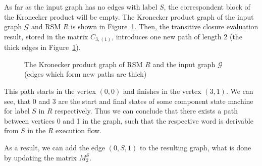 As far as the input graph has no edges with label $S$, the correspondent block of the Kronecker product will be empty. The Kronecker product graph of the input graph $\mathcal{G}$ and RSM $R$ is shown in Figure~\ref{fig:example_1_product}. Then, the transitive closure evaluation result, stored in the matrix $C_{3,(1)}$, introduces one new path of length 2 (the thick edges in Figure~\ref{fig:example_1_product}).

\begin{figure}[h]
    \centering
    \caption{The Kronecker product graph of RSM $R$ and the input graph $\mathcal{G}$ (edges which form new paths are thick)}
    \label{fig:example_1_product}
\end{figure}

This path starts in the vertex $(0,0)$ and finishes in the vertex $(3,1)$.
We can see, that 0 and 3 are the start and final states of some component
state machine for label $S$ in $R$ respectively. Thus we can conclude that
there exists a path between vertices 0 and 1 in the graph, such that the
respective word is derivable from $S$ in the $R$ execution flow.

As a result, we can add the edge $(0,S,1)$ to the resulting graph, what is done by updating the matrix $M_2^S$.

